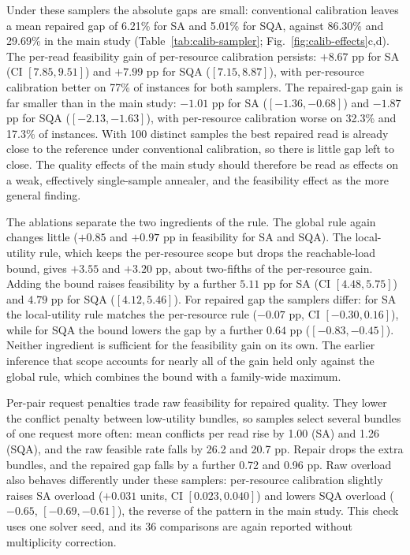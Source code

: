 \documentclass[pdflatex,sn-nature]{sn-jnl}
\theoremstyle{plain}
\theoremstyle{remark}
\begin{document}
Under these samplers the absolute gaps are small: conventional calibration leaves a mean repaired gap of 6.21\% for SA and 5.01\% for SQA, against 86.30\% and 29.69\% in the main study (Table~\ref{tab:calib-sampler}; Fig.~\ref{fig:calib-effects}c,d). The per-read feasibility gain of per-resource calibration persists: $+8.67$ pp for SA (CI $[7.85,9.51]$) and $+7.99$ pp for SQA ($[7.15,8.87]$), with per-resource calibration better on 77\% of instances for both samplers. The repaired-gap gain is far smaller than in the main study: $-1.01$ pp for SA ($[-1.36,-0.68]$) and $-1.87$ pp for SQA ($[-2.13,-1.63]$), with per-resource calibration worse on 32.3\% and 17.3\% of instances. With 100 distinct samples the best repaired read is already close to the reference under conventional calibration, so there is little gap left to close. The quality effects of the main study should therefore be read as effects on a weak, effectively single-sample annealer, and the feasibility effect as the more general finding.

The ablations separate the two ingredients of the rule. The global rule again changes little ($+0.85$ and $+0.97$ pp in feasibility for SA and SQA). The local-utility rule, which keeps the per-resource scope but drops the reachable-load bound, gives $+3.55$ and $+3.20$ pp, about two-fifths of the per-resource gain. Adding the bound raises feasibility by a further $5.11$ pp for SA (CI $[4.48,5.75]$) and $4.79$ pp for SQA ($[4.12,5.46]$). For repaired gap the samplers differ: for SA the local-utility rule matches the per-resource rule ($-0.07$ pp, CI $[-0.30,0.16]$), while for SQA the bound lowers the gap by a further $0.64$ pp ($[-0.83,-0.45]$). Neither ingredient is sufficient for the feasibility gain on its own. The earlier inference that scope accounts for nearly all of the gain held only against the global rule, which combines the bound with a family-wide maximum.

Per-pair request penalties trade raw feasibility for repaired quality. They lower the conflict penalty between low-utility bundles, so samples select several bundles of one request more often: mean conflicts per read rise by 1.00 (SA) and 1.26 (SQA), and the raw feasible rate falls by 26.2 and 20.7 pp. Repair drops the extra bundles, and the repaired gap falls by a further 0.72 and 0.96 pp. Raw overload also behaves differently under these samplers: per-resource calibration slightly raises SA overload ($+0.031$ units, CI $[0.023,0.040]$) and lowers SQA overload ($-0.65$, $[-0.69,-0.61]$), the reverse of the pattern in the main study. This check uses one solver seed, and its 36 comparisons are again reported without multiplicity correction.
\end{document}
